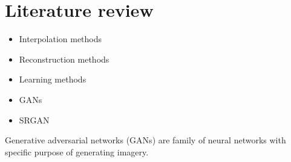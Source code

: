 \section{Literature review}

\begin{itemize}
    \item Interpolation methods
    \item Reconstruction methods
    \item Learning methods
    \item GANs
    \item SRGAN
\end{itemize}

Generative adversarial networks (GANs) are family of neural networks with specific purpose of generating imagery.